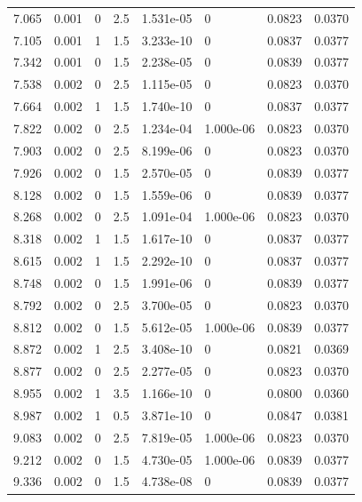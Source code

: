 \documentclass[preview]{standalone}
\begin{document}
{{{\begin{tabular}{L{1.2cm}C{1.2cm} C{0.3cm}C{0.5cm} C{1.4cm}C{1.4cm} C{1.4cm}C{1.4cm}}
  7.065  &  0.001  & 0     & 2.5 &  1.531e-05  & 0  & 0.0823 &  0.0370   \\ 
  7.105  &  0.001  & 1     & 1.5 &  3.233e-10  & 0  & 0.0837 &  0.0377   \\ 
  7.342  &  0.001  & 0     & 1.5 &  2.238e-05  & 0  & 0.0839 &  0.0377   \\ 
  7.538  &  0.002  & 0     & 2.5 &  1.115e-05  & 0  & 0.0823 &  0.0370   \\ 
  7.664  &  0.002  & 1     & 1.5 &  1.740e-10  & 0  & 0.0837 &  0.0377   \\ 
  7.822  &  0.002  & 0     & 2.5 &  1.234e-04  & 1.000e-06  & 0.0823 &  0.0370   \\ 
  7.903  &  0.002  & 0     & 2.5 &  8.199e-06  & 0  & 0.0823 &  0.0370   \\ 
  7.926  &  0.002  & 0     & 1.5 &  2.570e-05  & 0  & 0.0839 &  0.0377   \\ 
  8.128  &  0.002  & 0     & 1.5 &  1.559e-06  & 0  & 0.0839 &  0.0377   \\ 
  8.268  &  0.002  & 0     & 2.5 &  1.091e-04  & 1.000e-06  & 0.0823 &  0.0370   \\ 
  8.318  &  0.002  & 1     & 1.5 &  1.617e-10  & 0  & 0.0837 &  0.0377   \\ 
  8.615  &  0.002  & 1     & 1.5 &  2.292e-10  & 0  & 0.0837 &  0.0377   \\ 
  8.748  &  0.002  & 0     & 1.5 &  1.991e-06  & 0  & 0.0839 &  0.0377   \\ 
  8.792  &  0.002  & 0     & 2.5 &  3.700e-05  & 0  & 0.0823 &  0.0370   \\ 
  8.812  &  0.002  & 0     & 1.5 &  5.612e-05  & 1.000e-06  & 0.0839 &  0.0377   \\ 
  8.872  &  0.002  & 1     & 2.5 &  3.408e-10  & 0  & 0.0821 &  0.0369   \\ 
  8.877  &  0.002  & 0     & 2.5 &  2.277e-05  & 0  & 0.0823 &  0.0370   \\ 
  8.955  &  0.002  & 1     & 3.5 &  1.166e-10  & 0  & 0.0800 &  0.0360   \\ 
  8.987  &  0.002  & 1     & 0.5 &  3.871e-10  & 0  & 0.0847 &  0.0381   \\ 
  9.083  &  0.002  & 0     & 2.5 &  7.819e-05  & 1.000e-06  & 0.0823 &  0.0370   \\ 
  9.212  &  0.002  & 0     & 1.5 &  4.730e-05  & 1.000e-06  & 0.0839 &  0.0377   \\ 
  9.336  &  0.002  & 0     & 1.5 &  4.738e-08  & 0  & 0.0839 &  0.0377   \\ 

\end{tabular}}}}
\end{document}
